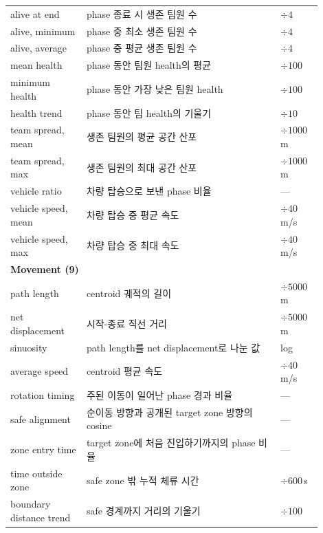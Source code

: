 \begin{table}[t]
\begin{tabular}{p{0.22\linewidth}p{0.56\linewidth}p{0.12\linewidth}}
alive at end & phase 종료 시 생존 팀원 수 & \(\div 4\) \\
alive, minimum & phase 중 최소 생존 팀원 수 & \(\div 4\) \\
alive, average & phase 중 평균 생존 팀원 수 & \(\div 4\) \\
mean health & phase 동안 팀원 health의 평균 & \(\div 100\) \\
minimum health & phase 동안 가장 낮은 팀원 health & \(\div 100\) \\
health trend & phase 동안 팀 health의 기울기 & \(\div 10\) \\
team spread, mean & 생존 팀원의 평균 공간 산포 & \(\div 1000\)\,m \\
team spread, max & 생존 팀원의 최대 공간 산포 & \(\div 1000\)\,m \\
vehicle ratio & 차량 탑승으로 보낸 phase 비율 & --- \\
vehicle speed, mean & 차량 탑승 중 평균 속도 & \(\div 40\)\,m/s \\
vehicle speed, max & 차량 탑승 중 최대 속도 & \(\div 40\)\,m/s \\
\midrule
\multicolumn{3}{l}{\textbf{Movement (9)}} \\
path length & centroid 궤적의 길이 & \(\div 5000\)\,m \\
net displacement & 시작-종료 직선 거리 & \(\div 5000\)\,m \\
sinuosity & path length를 net displacement로 나눈 값 & log \\
average speed & centroid 평균 속도 & \(\div 40\)\,m/s \\
rotation timing & 주된 이동이 일어난 phase 경과 비율 & --- \\
safe alignment & 순이동 방향과 공개된 target zone 방향의 cosine & --- \\
zone entry time & target zone에 처음 진입하기까지의 phase 비율 & --- \\
time outside zone & safe zone 밖 누적 체류 시간 & \(\div 600\)\,s \\
boundary distance trend & safe 경계까지 거리의 기울기 & \(\div 100\) \\
\bottomrule
\end{tabular}
\end{table}

